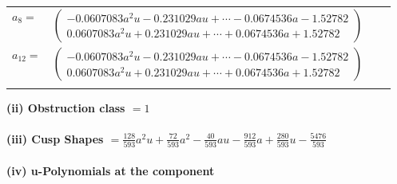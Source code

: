 \documentclass[1p]{elsarticle_modified}
\theoremstyle{definition}
\begin{document}
\begin{tabular}{m{7pt} m{180pt} m{7pt} m{180pt} }
\flushright $a_{8}=$&$\begin{pmatrix}-0.0607083 a^{2} u-0.231029 a u+\cdots-0.0674536 a-1.52782\\0.0607083 a^{2} u+0.231029 a u+\cdots+0.0674536 a+1.52782\end{pmatrix}$ \\
\flushright $a_{12}=$&$\begin{pmatrix}-0.0607083 a^{2} u-0.231029 a u+\cdots-0.0674536 a-1.52782\\0.0607083 a^{2} u+0.231029 a u+\cdots+0.0674536 a+1.52782\end{pmatrix}$\\&\end{tabular}
\flushleft \textbf{(ii) Obstruction class $= 1$}\\~\\
\flushleft \textbf{(iii) Cusp Shapes $= \frac{128}{593} a^2 u+\frac{72}{593} a^2-\frac{40}{593} a u-\frac{912}{593} a+\frac{280}{593} u-\frac{5476}{593}$}\\~\\
\newpage\renewcommand{\arraystretch}{1}
\flushleft \textbf{(iv) u-Polynomials at the component}\newline \\
\end{document}
